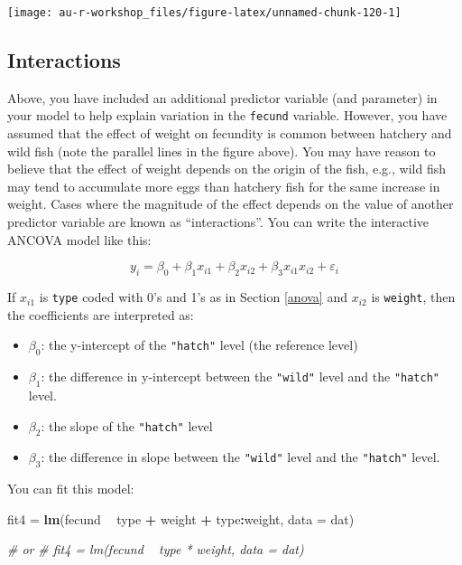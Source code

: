 \documentclass[]{book}
\newenvironment{Shaded}{\begin{snugshade}}{\end{snugshade}}
\newcommand{\KeywordTok}[1]{\textcolor[rgb]{0.13,0.29,0.53}{\textbf{#1}}}
\newcommand{\DataTypeTok}[1]{\textcolor[rgb]{0.13,0.29,0.53}{#1}}
\newcommand{\StringTok}[1]{\textcolor[rgb]{0.31,0.60,0.02}{#1}}
\newcommand{\CommentTok}[1]{\textcolor[rgb]{0.56,0.35,0.01}{\textit{#1}}}
\newcommand{\OperatorTok}[1]{\textcolor[rgb]{0.81,0.36,0.00}{\textbf{#1}}}
\newcommand{\NormalTok}[1]{#1}
\providecommand{\tightlist}{%
  \setlength{\itemsep}{0pt}\setlength{\parskip}{0pt}}
\theoremstyle{definition}
\theoremstyle{definition}
\theoremstyle{definition}
\theoremstyle{remark}
\begin{document}
\begin{center}\texttt{[image: au-r-workshop\_files/figure-latex/unnamed-chunk-120-1]} \end{center}

\subsection{Interactions}\label{interactions}

Above, you have included an additional predictor variable (and
parameter) in your model to help explain variation in the
\texttt{fecund} variable. However, you have assumed that the effect of
weight on fecundity is common between hatchery and wild fish (note the
parallel lines in the figure above). You may have reason to believe that
the effect of weight depends on the origin of the fish, e.g., wild fish
may tend to accumulate more eggs than hatchery fish for the same
increase in weight. Cases where the magnitude of the effect depends on
the value of another predictor variable are known as ``interactions''.
You can write the interactive ANCOVA model like this:

\begin{equation}
  y_i=\beta_0 + \beta_1 x_{i1} + \beta_2 x_{i2} + \beta_3 x_{i1} x_{i2} + \varepsilon_i
\label{eq:ancova-interact}
\end{equation}

If \(x_{i1}\) is \texttt{type} coded with 0's and 1's as in Section
\ref{anova} and \(x_{i2}\) is \texttt{weight}, then the coefficients are
interpreted as:

\begin{itemize}
\tightlist
\item
  \(\beta_0\): the y-intercept of the \texttt{"hatch"} level (the
  reference level)
\item
  \(\beta_1\): the difference in y-intercept between the \texttt{"wild"}
  level and the \texttt{"hatch"} level.
\item
  \(\beta_2\): the slope of the \texttt{"hatch"} level
\item
  \(\beta_3\): the difference in slope between the \texttt{"wild"} level
  and the \texttt{"hatch"} level.
\end{itemize}

You can fit this model:

\begin{Shaded}
\begin{Highlighting}[]
\NormalTok{fit4 =}\StringTok{ }\KeywordTok{lm}\NormalTok{(fecund }\OperatorTok{~}\StringTok{ }\NormalTok{type }\OperatorTok{+}\StringTok{ }\NormalTok{weight }\OperatorTok{+}\StringTok{ }\NormalTok{type}\OperatorTok{:}\NormalTok{weight, }\DataTypeTok{data =}\NormalTok{ dat)}

\CommentTok{# or}
\CommentTok{# fit4 = lm(fecund ~ type * weight, data = dat)}
\end{Highlighting}
\end{Shaded}
\end{document}
